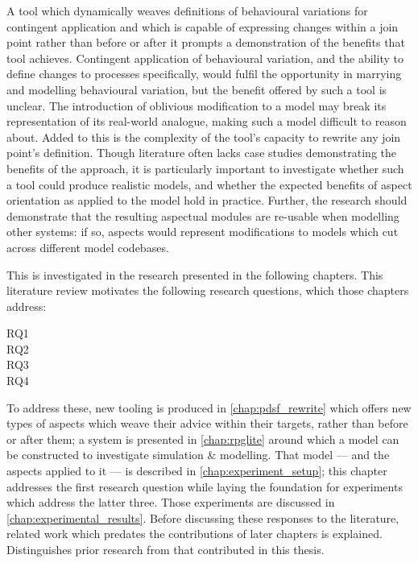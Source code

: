 A tool which dynamically weaves definitions of behavioural variations for
contingent application and which is capable of expressing changes within a join
point rather than before or after it prompts a demonstration of the benefits
that tool achieves. Contingent application of behavioural variation, and the
ability to define changes to processes specifically, would fulfil the
opportunity in marrying \aspectorientation{} and modelling behavioural
variation, but the benefit offered by such a tool is unclear. The introduction
of oblivious modification to a model may break its representation of its
real-world analogue, making such a model difficult to reason about. Added to
this is the complexity of the tool's capacity to rewrite any join point's
definition. Though \aop{} literature often lacks case studies demonstrating the
benefits of the approach, it is particularly important to investigate whether
such a tool could produce realistic models, and whether the expected benefits of
aspect orientation as applied to the model hold in practice. Further, the
research should demonstrate that the resulting aspectual modules are re-usable
when modelling other systems: if so, aspects would represent modifications to
models which cut across different model codebases.

This is investigated in the research presented in the following chapters. This
literature review motivates the following research questions, which those
chapters address:

\begin{researchquestion}
\begin{description}
  \item[RQ1] \rqone{}
  \item[RQ2] \rqtwo{}
  \item[RQ3] \rqthree{}
  \item[RQ4] \rqfour{}
\end{description}
\end{researchquestion}

To address these, new tooling is produced in \cref{chap:pdsf_rewrite} which
offers new types of aspects which weave their advice within their targets,
rather than before or after them; a system is presented in \cref{chap:rpglite}
around which a model can be constructed to investigate \aspectoriented{}
simulation \& modelling. That model --- and the aspects applied to it --- is
described in \cref{chap:experiment_setup}; this chapter addresses the first
research question while laying the foundation for experiments which address the
latter three. Those experiments are discussed in
\cref{chap:experimental_results}. Before discussing these responses to the
literature, related work which predates the contributions of later chapters is
explained.  Distinguishes prior research from that
contributed in this thesis.
